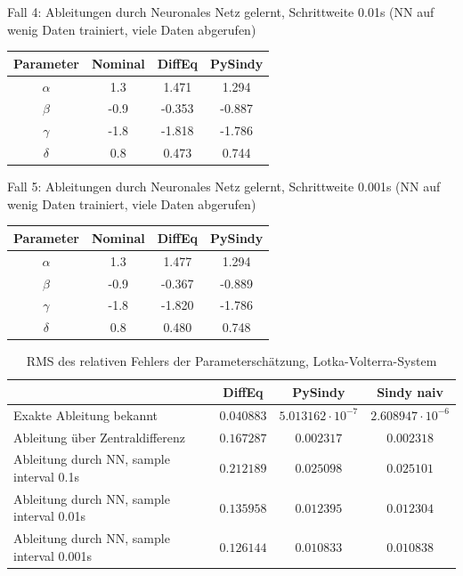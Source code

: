 \documentclass[arbeit=studie,oneside,BCOR=12mm]{ArbeitRST}
\begin{document}
Fall 4: Ableitungen durch Neuronales Netz gelernt, Schrittweite 0.01s (NN auf wenig Daten trainiert, viele Daten abgerufen)\\
\begin{tabular}[h]{c|c|c|c}
Parameter 	& Nominal 	& DiffEq		& PySindy 	\\\hline
$\alpha$ 	&  	 1.3	& 	1.471		&	1.294		\\\hline
$\beta$ 	&  	-0.9	& 	-0.353		&	-0.887		\\\hline
$\gamma$ 	&  	 -1.8	& 	-1.818		&	-1.786		\\\hline
$\delta$ 	&  	0.8		& 	0.473		&	0.744		\\
\end{tabular}

Fall 5: Ableitungen durch Neuronales Netz gelernt, Schrittweite 0.001s (NN auf wenig Daten trainiert, viele Daten abgerufen)\\
\begin{tabular}[h]{c|c|c|c}
Parameter 	& Nominal 	& DiffEq		& PySindy 	\\\hline
$\alpha$ 	&  	 1.3	& 	1.477		&	1.294		\\\hline
$\beta$ 	&  	-0.9	& 	-0.367		&	-0.889		\\\hline
$\gamma$ 	&  	 -1.8	& 	-1.820		&	-1.786		\\\hline
$\delta$ 	&  	0.8		& 	0.480		&	0.748		\\
\end{tabular}

\begin{table}[htbp]

\begin{tabular}[h]{l|c|c|c}
											& DiffEq		& PySindy 			& Sindy naiv		\\\hline
Exakte Ableitung bekannt					& 	$0.040883$		&	$5.013162\cdot10^{-7}$	& 	$2.608947\cdot10^{-6}$	\\\hline
Ableitung über Zentraldifferenz 			& 	$0.167287$		&	$0.002317$			&	$0.002318$			\\\hline
Ableitung durch NN, sample interval 0.1s	& 	$0.212189$		&	$0.025098$			&	$0.025101$			\\\hline
Ableitung durch NN, sample interval 0.01s	& 	$0.135958$		&	$0.012395$			&	$0.012304$			\\\hline
Ableitung durch NN, sample interval 0.001s	& 	$0.126144$		&	$0.010833$			&	$0.010838$			\\
\end{tabular}													 
\caption{RMS des relativen Fehlers der Parameterschätzung, Lotka-Volterra-System}
\end{table}
\end{document}
